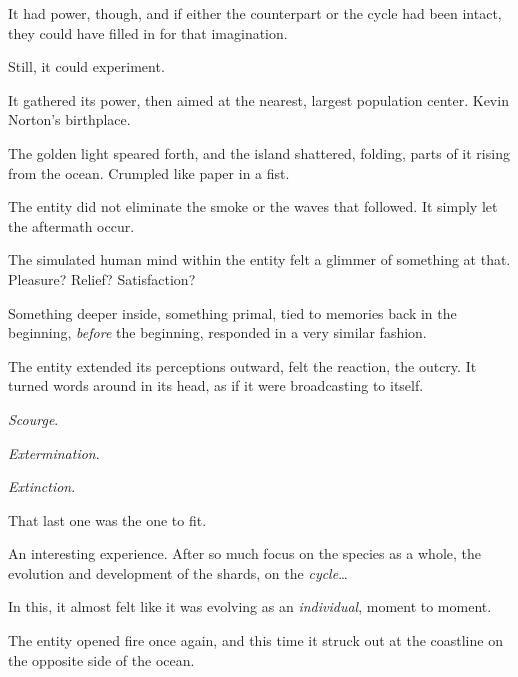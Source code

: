 It had power, though, and if either the counterpart or the cycle had been intact, they could have filled in for that imagination.



Still, it could experiment.



It gathered its power, then aimed at the nearest, largest population center.  Kevin Norton's birthplace.



The golden light speared forth, and the island shattered, folding, parts of it rising from the ocean.  Crumpled like paper in a fist.



The entity did not eliminate the smoke or the waves that followed.  It simply let the aftermath occur.



The simulated human mind within the entity felt a glimmer of something at that.  Pleasure?  Relief?  Satisfaction?



Something deeper inside, something primal, tied to memories back in the beginning, \emph{before} the beginning, responded in a very similar fashion.



The entity extended its perceptions outward, felt the reaction, the outcry.  It turned words around in its head, as if it were broadcasting to itself.



\emph{Scourge}.



\emph{Extermination}.



\emph{Extinction}.



That last one was the one to fit.



An interesting experience.  After so much focus on the species as a whole, the evolution and development of the shards, on the \emph{cycle}\ldots



In this, it almost felt like it was evolving as an \emph{individual}, moment to moment.



The entity opened fire once again, and this time it struck out at the coastline on the opposite side of the ocean.





